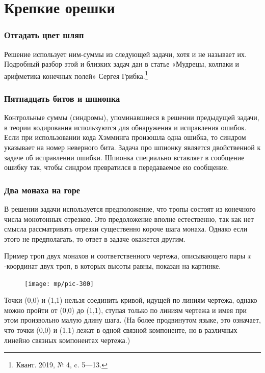 \documentclass[twoside]{book}
\begin{document}
\section{Крепкие орешки}

\subsubsection*{Отгадать цвет шляп}
Решение использует ним-суммы из следующей задачи, хотя и не называет их.
Подробный разбор этой и близких задач дан в статье «Мудрецы, колпаки и арифметика конечных полей» Сергея Грибка.\footnote{Квант. 2019, № 4, c. 5—13.}

\subsubsection{Пятнадцать битов и шпионка}
Контрольные суммы (синдромы), упоминавшиеся  в решении предыдущей задачи, в теории кодирования используются для обнаружения и исправления ошибок.
Если при использовании кода Хэмминга произошла одна ошибка, то синдром указывает на номер неверного бита.
Задача про шпионку является двойственной к задаче об исправлении ошибки.
Шпионка специально вставляет в сообщение ошибку так, чтобы синдром превратился в передаваемое ею сообщение.

\subsubsection{Два монаха на горе}
В решении задачи используется предположение, что тропы состоят из конечного числа монотонных отрезков.
Это предоложение вполне естественно, так как нет смысла рассматривать отрезки существенно короче шага монаха.
Однако если этого не предполагать, то ответ в задаче окажется другим.

Пример троп двух монахов и соответственного чертежа, описывающего пары $x$-координат двух троп, в которых высоты равны, показан на картинке.
\begin{figure}[ht!]
\vskip-0mm
\centering
\texttt{[image: mp/pic-300]}
\end{figure}
Точки (0,0) и (1,1) нельзя соединить кривой, идущей по линиям чертежа, 
однако можно пройти от (0,0) до (1,1), ступая только по линиям чертежа и имея при этом произвольно малую длину шага.
(На более продвинутом языке, это означает, что точки (0,0) и (1,1) лежат в одной связной компоненте, но в различных линейно связных компонентах чертежа.)
\end{document}

